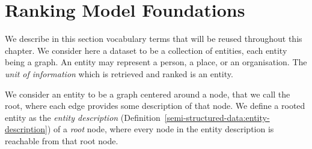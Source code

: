 %
%

\section{Ranking Model Foundations}

We describe in this section vocabulary terms that will be reused throughout this chapter. We consider here a dataset to be a collection of entities, each entity being a graph. An entity may represent a person, a place, or an organisation. The \emph{unit of information} which is retrieved and ranked is an entity.

We consider an entity to be a graph centered around a node, that we call the root, where each edge provides some description of that node. We define a rooted entity as the \emph{entity description} (Definition~\ref{semi-structured-data:entity-description}) of a \emph{root} node, where every node in the entity description is reachable from that root node.


